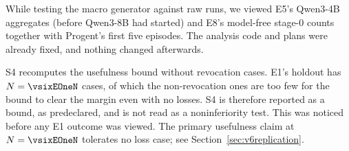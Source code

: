  While testing the macro generator against raw runs, we viewed E5's Qwen3-4B aggregates (before
Qwen3-8B had started) and E8's model-free stage-0 counts together with Progent's first five episodes. The analysis code
and plans were already fixed, and nothing changed afterwards.

 S4 recomputes the usefulness bound without revocation cases. E1's holdout
has \(N = \vsixEOneN\) cases, of which the non-revocation ones are too few for the bound to clear the margin even with no
losses. S4 is therefore reported as a bound, as predeclared, and is not read as a noninferiority test. This was noticed
before any E1 outcome was viewed. The primary usefulness claim at \(N = \vsixEOneN\) tolerates no loss case; see
Section~\ref{sec:v6replication}.
